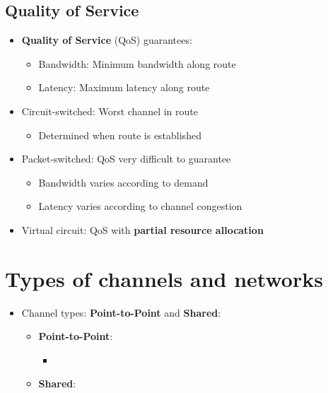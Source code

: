 \documentclass[conference]{IEEEtran}
\begin{document}
\subsection{Quality of Service}

\begin{itemize}
    \item \textbf{Quality of Service} (QoS) guarantees: 
    \begin{itemize}
        \item Bandwidth: Minimum bandwidth along route  
        \item Latency: Maximum latency along route 
    \end{itemize}

    \item Circuit-switched: Worst channel in route 
    \begin{itemize}
        \item Determined when route is established
    \end{itemize}
    \item Packet-switched: QoS very difficult to guarantee
    \begin{itemize}
        \item Bandwidth varies according to demand 
        \item Latency varies according to channel congestion
    \end{itemize}
    \item Virtual circuit: QoS with \textbf{partial resource allocation}
\end{itemize}

\section{\textbf{Types of channels and networks}}

\begin{itemize}
    \item Channel types: \textbf{Point-to-Point} and \textbf{Shared}:
    \begin{itemize}
        
        \item \textbf{Point-to-Point}:
        \begin{itemize}
            \item 
        \end{itemize}
        \item \textbf{Shared}:
    \end{itemize}
\end{itemize}



\end{document}
